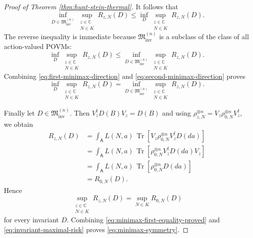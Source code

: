 \documentclass{article}
\theoremstyle{named}
\theoremstyle{named1}
\newcommand{\N}{\mathbb{N}}
\newcommand{\Tr}{\operatorname{Tr}}
\newcommand{\bbC}{\mathbb C}
\newcommand{\cM}{\mathfrak M}
\theoremstyle{plain}
\theoremstyle{remark}
\begin{document}
\begin{proof}[Proof of Theorem \ref{thm:hunt-stein-thermal}]
It follows that
\begin{equation}
    \inf_{D\in\cM_{\mathrm{inv}}^{(n)}}
    \sup_{\substack{z\in\bbC\\N\in K}}
    R_{z,N}(D)
    \leq
    \inf_D
    \sup_{\substack{z\in\bbC\\N\in K}}
    R_{z,N}(D).
    \label{eq:first-minimax-direction}
\end{equation}
The reverse inequality is immediate because
$\cM_{\mathrm{inv}}^{(n)}$
is a subclass of the class of all action-valued POVMs:
\begin{equation}
    \inf_D
    \sup_{\substack{z\in\bbC\\N\in K}}
    R_{z,N}(D)
    \leq
    \inf_{D\in\cM_{\mathrm{inv}}^{(n)}}
    \sup_{\substack{z\in\bbC\\N\in K}}
    R_{z,N}(D).
    \label{eq:second-minimax-direction}
\end{equation}
Combining \eqref{eq:first-minimax-direction} and
\eqref{eq:second-minimax-direction} proves
\begin{equation}
    \inf_D
    \sup_{\substack{z\in\bbC\\N\in K}}
    R_{z,N}(D)
    =
    \inf_{D\in\cM_{\mathrm{inv}}^{(n)}}
    \sup_{\substack{z\in\bbC\\N\in K}}
    R_{z,N}(D).
    \label{eq:minimax-first-equality-proved}
\end{equation}


Finally let \(D\in\cM_{\mathrm{inv}}^{(n)}\). Then
$
    V_z^\dagger D(B)V_z=D(B)
$ and 
using
$\rho_{z,N}^{\otimes n}
    =
    V_z\rho_{0,N}^{\otimes n}V_z^\dagger,
$ we obtain
\begin{align}
    R_{z,N}(D)
    &=
    \int_{\mathsf A}
        L(N,a)\,
        \Tr\!\left[
            V_z\rho_{0,N}^{\otimes n}V_z^\dagger
            D(da)
        \right]
    \nonumber\\
    &=
    \int_{\mathsf A}
        L(N,a)\,
        \Tr\!\left[
            \rho_{0,N}^{\otimes n}
            V_z^\dagger D(da)V_z
        \right]
    \nonumber\\
    &=
    \int_{\mathsf A}
        L(N,a)\,
        \Tr\!\left[
            \rho_{0,N}^{\otimes n}D(da)
        \right]
    \nonumber\\
    &=
    R_{0,N}(D).
    \label{eq:invariant-risk-independent-displacement}
\end{align}
Hence
\begin{equation}
    \sup_{\substack{z\in\bbC\\N\in K}}
    R_{z,N}(D)
    =
    \sup_{N\in K}R_{0,N}(D)
    \label{eq:invariant-maximal-risk}
\end{equation}
for every invariant \(D\). Combining
\eqref{eq:minimax-first-equality-proved} and
\eqref{eq:invariant-maximal-risk} proves
\eqref{eq:minimax-symmetry}.


\end{proof}
\end{document}
